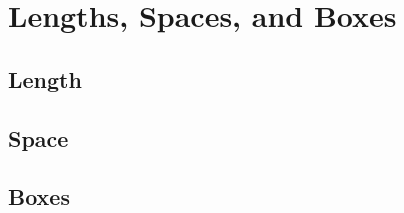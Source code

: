 \section{Lengths, Spaces, and Boxes}
\subsection{Length}


\subsection{Space}


\subsection{Boxes}
\newpage
